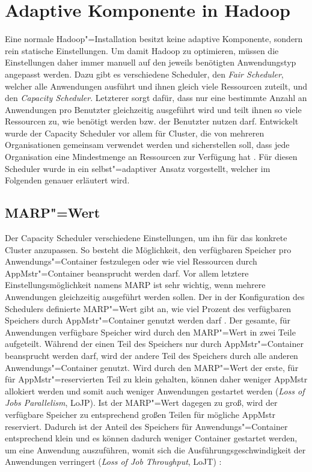 \section{Adaptive Komponente in Hadoop}
\label{sec:inriaSetting}

Eine normale Hadoop"=Installation besitzt keine adaptive Komponente, sondern rein statische Einstellungen.
Um damit Hadoop zu optimieren, müssen die Einstellungen daher immer manuell auf den jeweils benötigten Anwendungstyp angepasst werden.
Dazu gibt es verschiedene Scheduler, den \emph{Fair Scheduler}, welcher alle Anwendungen ausführt und ihnen gleich viele Ressourcen zuteilt, und den \emph{Capacity Scheduler}.
Letzterer sorgt dafür, dass nur eine bestimmte Anzahl an Anwendungen pro Benutzter gleichzeitig ausgeführt wird und teilt ihnen so viele Ressourcen zu, wie benötigt werden bzw. der Benutzter nutzen darf.
Entwickelt wurde der Capacity Scheduler vor allem für Cluster, die von mehreren Organisationen gemeinsam verwendet werden und sicherstellen soll, dass jede Organisation eine Mindestmenge an Ressourcen zur Verfügung hat \cite{HadoopCapScheduler271}.
Für diesen Scheduler wurde in \cite{zhang2016} ein selbst"=adaptiver Ansatz vorgestellt, welcher im Folgenden genauer erläutert wird.

\subsection{\acs{MARP}"=Wert}
\label{subsec:selfbalancingMarp}

Der Capacity Scheduler verschiedene Einstellungen, um ihn für das konkrete Cluster anzupassen.
So besteht \zB die Möglichkeit, den verfügbaren Speicher pro Anwendungs"=Container festzulegen oder wie viel Ressourcen durch \ac{AppMstr}"=Container beansprucht werden darf.
Vor allem letztere Einstellungsmöglichkeit namens \ac{MARP} ist sehr wichtig, wenn mehrere Anwendungen gleichzeitig ausgeführt werden sollen.
Der in der Konfiguration des Schedulers definierte \ac{MARP}"=Wert gibt an, wie viel Prozent des verfügbaren Speichers durch \ac{AppMstr}"=Container genutzt werden darf \cite{HadoopCapScheduler271}.
Der gesamte, für Anwendungen verfügbare Speicher wird durch den \ac{MARP}"=Wert in zwei Teile aufgeteilt.
Während der einen Teil des Speichers nur durch \ac{AppMstr}"=Container beansprucht werden darf, wird der andere Teil des Speichers durch alle anderen Anwendungs"=Container genutzt.
Wird durch den \ac{MARP}"=Wert der erste, für für \ac{AppMstr}"=reservierten Teil zu klein gehalten, können daher weniger \ac{AppMstr} allokiert werden und somit auch weniger Anwendungen gestartet werden (\emph{Loss of Jobs Parallelism}, LoJP).
Ist der \ac{MARP}"=Wert dagegen zu groß, wird der verfügbare Speicher zu entsprechend großen Teilen für mögliche \ac{AppMstr} reserviert.
Dadurch ist der Anteil des Speichers für Anwendungs"=Container entsprechend klein und es können dadurch weniger Container gestartet werden, um eine Anwendung auszuführen, womit sich die Ausführungsgeschwindigkeit der Anwendungen verringert (\emph{Loss of Job Throughput}, LoJT) \cite{zhang2016}:

